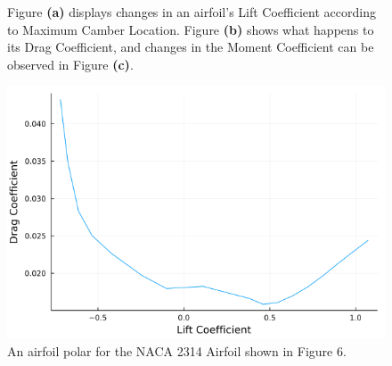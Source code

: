 \documentclass{article}
\begin{document}
\begin{figure}[!htb]
  \centering
  \caption{Figure \textbf{(a)} displays changes in an airfoil's Lift Coefficient according to Maximum Camber Location. Figure \textbf{(b)} shows what happens to its Drag Coefficient, and changes in the Moment Coefficient can be observed in Figure \textbf{(c)}.}
  \label{fig:6}
\end{figure}

\begin{figure}
  \includegraphics[width=\linewidth]{Figure19.png}
  \caption{An airfoil polar for the NACA 2314 Airfoil shown in Figure 6.}
  \label{fig:7}
\end{figure}
\end{document}
